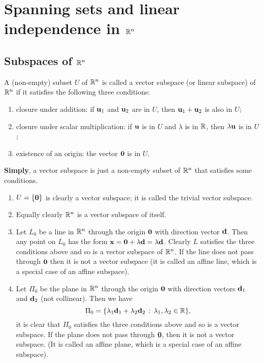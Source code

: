 \documentclass[10pt, a4paper]{article}
\begin{document}
\newpage

\section{Spanning sets and linear independence in \texorpdfstring{$\mathbb{R} ^ n$}{}}
\subsection{Subspaces of \texorpdfstring{$\mathbb{R} ^ n$}{}}
\begin{definition}
    A (non-empty) subset $U$ of $\mathbb{R} ^ n$ is called a vector subspace (or linear subspace) of $\mathbb{R} ^ n$ if it satisfies the following three conditions:
    \begin{enumerate}[label = (\roman*)]
        \item closure under addition:
        if $\mathbf{u}_1$ and $\mathbf{u}_2$ are in $U$,
        then $\mathbf{u}_1 + \mathbf{u}_2$ is also in $U$;
        \item closure under scalar multiplication:
        if $\mathbf{u}$ is in $U$ and $\lambda$ is in $\mathbb{R}$,
        then $\lambda\mathbf{u}$ is in $U$;
        \item existence of an origin:
        the vector $\mathbf{0}$ is in $U$.
    \end{enumerate}
\end{definition}
\textbf{Simply},
a vector subspace is just a non-empty subset of $\mathbb{R} ^ n$ that satisfies some conditions.

\begin{example}
    \begin{enumerate}[label = (\roman*)]
        \item  $U = \{\mathbf{0}\}$ is clearly a vector subspace;
        it is called the trivial vector subspace.
        \item Equally clearly $\mathbb{R} ^ n$ is a vector subspace of itself.
        \item Let $L_0$ be a line in $\mathbb{R} ^ n$ through the origin $\mathbf{0}$ with direction vector $\mathbf{d}$.
        Then any point on $L_0$ has the form $\mathbf{x} = \mathbf{0} + \lambda\mathbf{d} = \lambda\mathbf{d}$.
        Clearly $L$ satisfies the three conditions above and so is a vector subspace of $\mathbb{R} ^ n$.
        If the line does not pass through $\mathbf{0}$ then it is not a vector subspace
        (it is called an affine line,
        which is a special case of an affine subspace).
        \item Let $\Pi_0$ be the plane in $\mathbb{R} ^ n$ through the origin $\mathbf{0}$ with direction vectors $\mathbf{d}_1$ and $\mathbf{d}_2$ (not collinear).
        Then we have
        \[
        \Pi_0 = \{\lambda_1\mathbf{d}_1 + \lambda_2\mathbf{d}_2\,:\, \lambda_1, \lambda_2 \in \mathbb{R}\},
        \]
        it is clear that $\Pi_0$ satisfies the three conditions above and so is a vector subspace.
        If the plane does not pass through $\mathbf{0}$,
        then it is not a vector subspace.
        (It is called an affine plane,
        which is a special case of an affine subspace).
    \end{enumerate}
\end{example}
\end{document}
